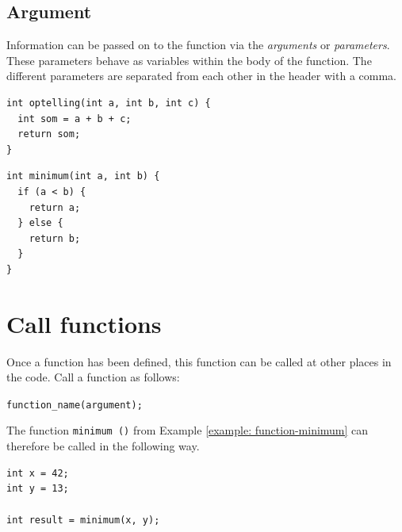 \documentclass[11pt,fleqn]{book} %
\begin{document}
\subsection{Argument}
Information can be passed on to the function via the \emph{arguments} or \emph{parameters}. These parameters behave as variables within the body of the function. The different parameters are separated from each other in the header with a comma.

\begin{example}
	\phantom{ }
	\begin{verbatim}
int optelling(int a, int b, int c) {
  int som = a + b + c;
  return som;
}
	\end{verbatim}
\end{example}

\begin{example}
	\label{example:function-minimum}
	\phantom{ }
	\begin{verbatim}
int minimum(int a, int b) {
  if (a < b) {
    return a;
  } else {
    return b;
  }
}
	\end{verbatim}
\end{example}

\section{Call functions}
Once a function has been defined, this function can be called at other places in the code. Call a function as follows:

\begin{center}
	\texttt{function\_name(argument);}
\end{center}
\noindent
The function \texttt{minimum ()} from Example \ref{example: function-minimum} can therefore be called in the following way.

\begin{example}
	\phantom{ }
	\begin{verbatim}
int x = 42;
int y = 13;

int result = minimum(x, y);
	\end{verbatim}
\end{example}

\end{document}
